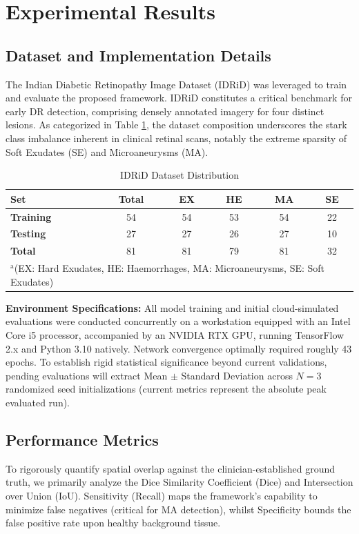 \section{Experimental Results}
\subsection{Dataset and Implementation Details}
The Indian Diabetic Retinopathy Image Dataset (IDRiD) \cite{idrid_dataset} was leveraged to train and evaluate the proposed framework. IDRiD constitutes a critical benchmark for early DR detection, comprising densely annotated imagery for four distinct lesions. As categorized in Table \ref{tab:dataset}, the dataset composition underscores the stark class imbalance inherent in clinical retinal scans, notably the extreme sparsity of Soft Exudates (SE) and Microaneurysms (MA).

\begin{table}[htbp]
\caption{IDRiD Dataset Distribution}
\begin{center}
\begin{tabular}{l c c c c c}
\toprule
\textbf{Set} & \textbf{Total} & \textbf{EX} & \textbf{HE} & \textbf{MA} & \textbf{SE} \\
\midrule
\textbf{Training} & 54 & 54 & 53 & 54 & 22 \\
\textbf{Testing} & 27 & 27 & 26 & 27 & 10 \\
\midrule
\textbf{Total} & 81 & 81 & 79 & 81 & 32 \\
\bottomrule
\multicolumn{6}{l}{$^{\mathrm{a}}$(EX: Hard Exudates, HE: Haemorrhages, MA: Microaneurysms, SE: Soft Exudates)}
\end{tabular}
\label{tab:dataset}
\end{center}
\end{table}

\textbf{Environment Specifications:} All model training and initial cloud-simulated evaluations were conducted concurrently on a workstation equipped with an Intel Core i5 processor, accompanied by an NVIDIA RTX GPU, running TensorFlow 2.x and Python 3.10 natively. Network convergence optimally required roughly 43 epochs. To establish rigid statistical significance beyond current validations, pending evaluations will extract Mean $\pm$ Standard Deviation across $N=3$ randomized seed initializations (current metrics represent the absolute peak evaluated run).

\subsection{Performance Metrics}
To rigorously quantify spatial overlap against the clinician-established ground truth, we primarily analyze the Dice Similarity Coefficient (Dice) and Intersection over Union (IoU). Sensitivity (Recall) maps the framework's capability to minimize false negatives (critical for MA detection), whilst Specificity bounds the false positive rate upon healthy background tissue.

